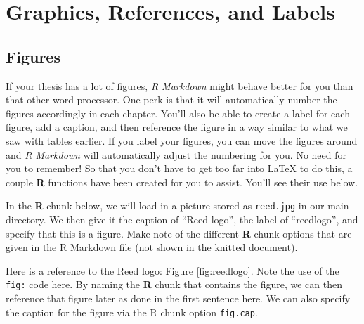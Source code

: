 \hypertarget{ref-labels}{%
\chapter{Graphics, References, and Labels}\label{ref-labels}}

\hypertarget{figures}{%
\section{Figures}\label{figures}}

If your thesis has a lot of figures, \emph{R Markdown} might behave better for you than that other word processor. One perk is that it will automatically number the figures accordingly in each chapter. You'll also be able to create a label for each figure, add a caption, and then reference the figure in a way similar to what we saw with tables earlier. If you label your figures, you can move the figures around and \emph{R Markdown} will automatically adjust the numbering for you. No need for you to remember! So that you don't have to get too far into LaTeX to do this, a couple \textbf{R} functions have been created for you to assist. You'll see their use below.

In the \textbf{R} chunk below, we will load in a picture stored as \texttt{reed.jpg} in our main directory. We then give it the caption of ``Reed logo'', the label of ``reedlogo'', and specify that this is a figure. Make note of the different \textbf{R} chunk options that are given in the R Markdown file (not shown in the knitted document).

Here is a reference to the Reed logo: Figure \ref{fig:reedlogo}. Note the use of the \texttt{fig:} code here. By naming the \textbf{R} chunk that contains the figure, we can then reference that figure later as done in the first sentence here. We can also specify the caption for the figure via the R chunk option \texttt{fig.cap}.

\clearpage

